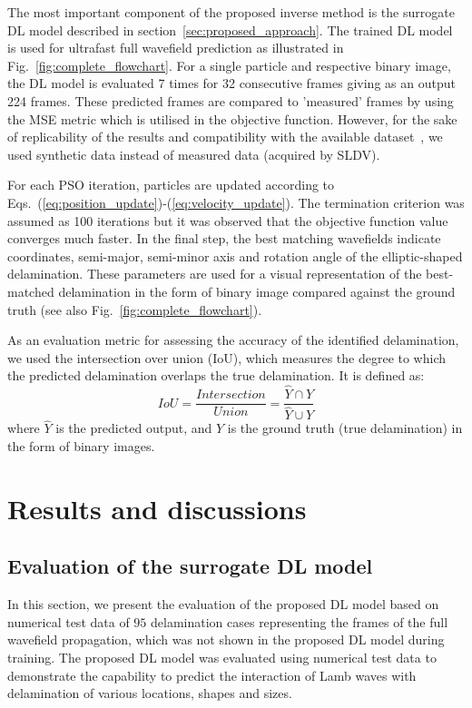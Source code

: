 \documentclass[sn-mathphys-num]{sn-jnl}%
\begin{document}
	The most important component of the proposed inverse method is the 
	surrogate DL model described in section~\ref{sec:proposed_approach}.
	The trained DL model is used for ultrafast full wavefield prediction as 
	illustrated in Fig.~\ref{fig:complete_flowchart}.
	For a single particle and respective binary image, the DL model is 
	evaluated 7 times for 32 consecutive frames giving as an output 224 frames. 
	These predicted frames are compared to 'measured' frames by using the MSE 
	metric which is utilised in the objective function.
	However, for the sake of replicability of the results and compatibility 
	with the available dataset~\cite{kudela_pawel_2021_5414555}, we used 
	synthetic data instead of measured data (acquired by SLDV).
	
	For each PSO iteration, particles are updated according to 
	Eqs.~(\ref{eq:position_update})-(\ref{eq:velocity_update}).
	The termination criterion was assumed as 100 iterations but it was observed 
	that the objective function value converges much faster.
	In the final step, the best matching wavefields indicate coordinates, 
	semi-major, semi-minor axis and rotation angle of the elliptic-shaped 
	delamination. 
	These parameters are used for a visual representation of the best-matched 
	delamination in the form of binary image compared against the ground truth 
	(see also Fig.~\ref{fig:complete_flowchart}).
	
	As an evaluation metric for assessing the accuracy of the identified 
	delamination, we used the intersection over union (IoU), which measures the 
	degree to which the predicted delamination overlaps the true delamination. 
	It is defined as:
	\begin{equation}
		IoU=\frac{Intersection}{Union}=\frac{\hat{Y} \cap Y}{\hat{Y} \cup Y}
		\label{eq:iou}
	\end{equation}
	where \(\hat{Y}\) is the predicted output, and \(Y\) is the ground truth 
	(true delamination) in the form of binary images.
	\section{Results and discussions}
	\subsection{Evaluation of the surrogate DL model}
	In this section, we present the evaluation of the proposed DL model based 
	on numerical test data of \(95\) delamination cases representing the frames 
	of the full wavefield propagation, which was not shown in the proposed DL 
	model during training. 
	The proposed DL model was evaluated using numerical test data to 
	demonstrate the capability to predict the interaction of Lamb waves with 
	delamination of various locations, shapes and sizes.
	
\end{document}
